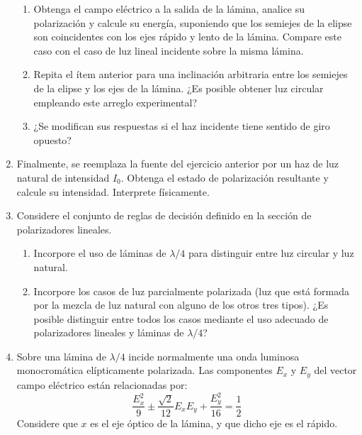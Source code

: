 \documentclass[11pt,spanish]{article}
\begin{document}
\begin{enumerate}
    \begin{enumerate}
        \item Obtenga el campo eléctrico a la salida de la lámina, analice su
        polarización y calcule su energía, suponiendo que los semiejes de la
        elipse son coincidentes con los ejes rápido y lento de la lámina.
        Compare este caso con el caso de luz lineal incidente sobre la misma
        lámina.
        
        \item Repita el ítem anterior para una inclinación arbitraria entre los
        semiejes de la elipse y los ejes de la lámina. ¿Es posible obtener luz
        circular empleando este arreglo experimental?
        
        \item ¿Se modifican sus respuestas si el haz incidente tiene sentido de
        giro opuesto?

    \end{enumerate}


    \item Finalmente, se reemplaza la fuente del ejercicio anterior por un haz
    de luz natural de intensidad $I_{0}$. Obtenga el estado de polarización
    resultante y calcule su intensidad. Interprete físicamente.


    \item Considere el conjunto de reglas de decisión definido en la sección de
    polarizadores lineales.
    
    \begin{enumerate}
        \item Incorpore el uso de láminas de $\lambda/4$ para distinguir entre
        luz circular y luz natural.
        
        \item Incorpore los casos de luz parcialmente polarizada (luz que está
        formada por la mezcla de luz natural con alguno de los otros tres tipos).
        ¿Es posible distinguir entre todos los casos mediante el uso adecuado de
        polarizadores lineales y láminas de $\lambda/4$?
    \end{enumerate}


    \item Sobre una lámina de $\lambda/4$ incide normalmente una onda luminosa
    monocromática elípticamente polarizada. Las componentes $E_{x}$ y
    $E_{y}$ del vector campo eléctrico están relacionadas por:
    \[
    \frac{E_{x}^{2}}{9}\pm\frac{\sqrt{2}}{12}E_{x}E_{y}+\frac{E_{y}^{2}}{16}=\frac{1}{2}
    \]
    Considere que $x$ es el eje óptico de la lámina, y que dicho eje
    es el rápido.


\end{enumerate}
\end{document}

